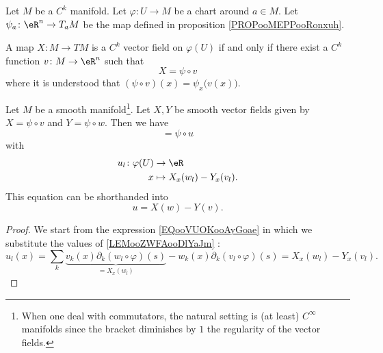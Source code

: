 \begin{lemma}       \label{LEMooPWMUooRalWxC}
    Let \( M\) be a \( C^k\) manifold. Let \( \varphi\colon U\to M\) be a chart around \( a\in M\). Let \( \psi_a\colon \eR^n\to T_aM \) be the map defined in proposition \ref{PROPooMEPPooRonxuh}.

    A map \( X\colon M\to TM\) is a \( C^k\) vector field on \( \varphi(U)\) if and only if there exist a \( C^k\) function \( v\colon M\to \eR^n\) such that 
    \begin{equation}
        X=\psi\circ v
    \end{equation}
    where it is understood that \( (\psi\circ v)(x)=\psi_x\big( v(x) \big)\).
\end{lemma}


\begin{lemma}
    Let \( M\) be a smooth manifold\footnote{When one deal with commutators, the natural setting is (at least) \(  C^{\infty}\) manifolds since the bracket diminishes by \( 1\) the regularity of the vector fields.}. Let \( X,Y\) be smooth vector fields given by \( X=\psi\circ v\) and \( Y=\psi\circ w\). Then we have
    \begin{equation}
        [\psi\circ v,\psi\circ w]=\psi\circ u
    \end{equation}
    with
    \begin{equation}
        \begin{aligned}
            u_l\colon \varphi(U)&\to \eR \\
            x&\mapsto X_x(w_l)-Y_x(v_l). 
        \end{aligned}
    \end{equation}
    This equation can be shorthanded into
    \begin{equation}
        u=X(w)-Y(v).
    \end{equation}
\end{lemma}

\begin{proof}
    We start from the expression \ref{EQooVUOKooAyGoae} in which we substitute the values of \eqref{LEMooZWFAooDlYaJm} :
    \begin{equation}
        u_l(x)=\sum_k\underbrace{v_k(x)\partial_k(w_l\circ\varphi)(s)}_{=X_x(w_l)}-w_k(x)\partial_k(v_l\circ\varphi)(s)=X_x(w_l)-Y_x(v_l).
    \end{equation}
\end{proof}

